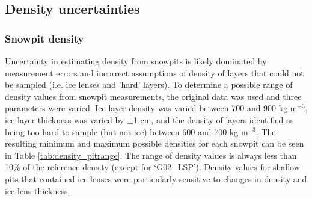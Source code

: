 \documentclass[12pt]{article}
\begin{document}
\subsection*{Density uncertainties}

\subsubsection*{Snowpit density}

Uncertainty in estimating density from snowpits is likely dominated by measurement errors and incorrect assumptions of density of layers that could not be sampled (i.e. ice lenses and 'hard' layers). To determine a possible range of density values from snowpit measurements, the original data was used and three parameters were varied. Ice layer density was varied between 700 and 900 kg m$^{-3}$, ice layer thickness was varied by $\pm$1 cm, and the density of layers identified as being too hard to sample (but not ice) between 600 and 700 kg m$^{-3}$. The resulting minimum and maximum possible densities for each snowpit can be seen in Table \ref{tab:density_pitrange}. The range of density values is always less than 10\% of the reference density (except for `G02\_LSP'). Density values for shallow pits that contained ice lenses were particularly sensitive to changes in density and ice lens thickness. 
\end{document}
